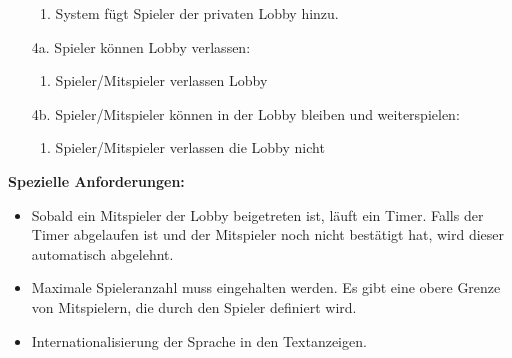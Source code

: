 \documentclass[11pt,ngerman]{article}
\begin{document}
\begin{tcolorbox}
\begin{itemize}
\begin{enumerate}
    			\item System fügt Spieler der privaten \Gls{Lobby} hinzu.
    		\end{enumerate}
    		\item[4a.] Spieler können \Gls{Lobby} verlassen:
    		\begin{enumerate}
    			\item Spieler/Mitspieler verlassen \Gls{Lobby}
    		\end{enumerate}
    		\item[4b.] Spieler/Mitspieler können in der \Gls{Lobby} bleiben und weiterspielen:
    		\begin{enumerate}
    			\item Spieler/Mitspieler verlassen die \Gls{Lobby} nicht
    		\end{enumerate}
    	\end{itemize}
    	\textbf{Spezielle Anforderungen:}
    	\begin{itemize}
    		\item Sobald ein Mitspieler der \Gls{Lobby} beigetreten ist, läuft ein Timer. Falls der Timer abgelaufen ist und der Mitspieler noch nicht bestätigt hat, wird dieser automatisch abgelehnt.
    		\item Maximale Spieleranzahl muss eingehalten werden. Es gibt eine obere Grenze von Mitspielern, die durch den Spieler definiert wird.
    		\item Internationalisierung der Sprache in den Textanzeigen.
    	\end{itemize}

    \end{tcolorbox}
\end{document}
